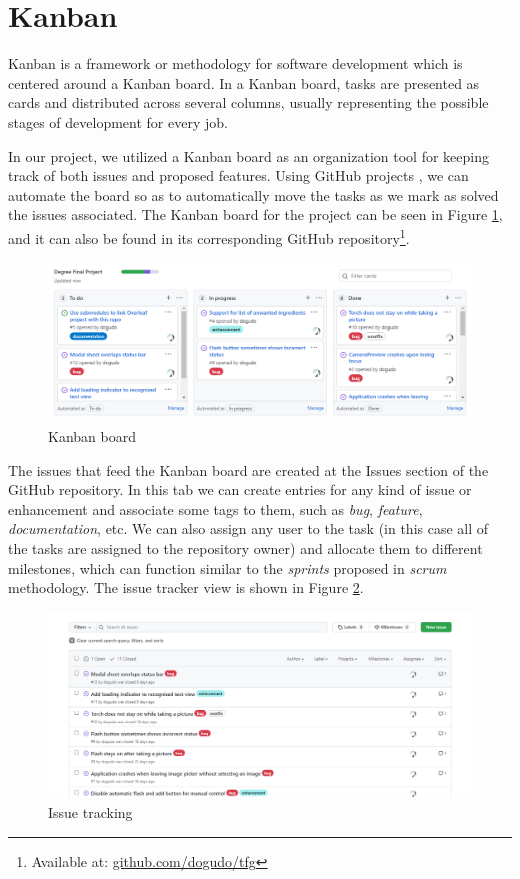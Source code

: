 \section{Kanban}

Kanban \cite{noauthor_kanban_2021} is a framework or methodology for software development which is centered around a Kanban board. In a Kanban board, tasks are presented as cards and distributed across several columns, usually representing the possible stages of development for every job. 

In our project, we utilized a Kanban board as an organization tool for keeping track of both issues and proposed features. Using GitHub projects \cite{noauthor_githubcom_2021}, we can automate the board so as to automatically move the tasks as we mark as solved the issues associated. The Kanban board for the project can be seen in Figure \ref{fig:kanban}, and it can also be found in its corresponding GitHub repository\footnote{Available at: \url{github.com/dogudo/tfg}}.

\begin{figure}[h]
  \centering
  \includegraphics[width=\textwidth]{Figures/kanban_board.png}
  \caption{%
    Kanban board
  }
  \label{fig:kanban}
\end{figure}

The issues that feed the Kanban board are created at the Issues section of the GitHub repository. In this tab we can create entries for any kind of issue or enhancement and associate some tags to them, such as \textit{bug}, \textit{feature}, \textit{documentation}, etc. We can also assign any user to the task (in this case all of the tasks are assigned to the repository owner) and allocate them to different milestones, which can function similar to the \textit{sprints} proposed in \textit{scrum} methodology. The issue tracker view is shown in Figure \ref{fig:issue-tracking}.

\begin{figure}[h]
  \centering
  \includegraphics[width=\textwidth]{Figures/issue_tracking.png}
  \caption{%
    Issue tracking
  }
  \label{fig:issue-tracking}
\end{figure}

